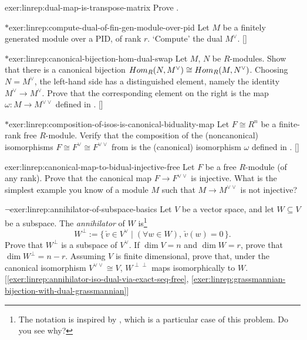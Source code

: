 \begin{exer}{}{exer:linrep:dual-map-is-transpose-matrix}
  Prove .
\end{exer}

\begin{exer}{$*$}{exer:linrep:compute-dual-of-fin-gen-module-over-pid}
  Let $M$ be a finitely generated module over a PID, of rank $r$.
  `Compute' the dual
  $M^\vee$. []
\end{exer}

\begin{exer}{$*$}{exer:linrep:canonical-bijection-hom-dual-swap}
  Let $M$, $N$ be $R$-modules. Show that there is a canonical
  bijection $Hom_R(N, M^\vee) \cong Hom_R(M, N^\vee)$. Choosing
  $N = M^\vee$, the left-hand side has a distinguished element, namely
  the identity $M^\vee \to M^\vee$.  Prove that the corresponding
  element on the right is the map $\omega : M \to M^{\vee\vee}$
  defined in
  . []
\end{exer}

\begin{exer}{$*$}{exer:linrep:composition-of-isos-is-canonical-biduality-map}
  Let $F \cong R^n$ be a finite-rank free $R$-module. Verify that the
  composition of the (noncanonical) isomorphisms
  $F \cong F^\vee \cong F^{\vee\vee}$ from 
  is the (canonical) isomorphism $\omega$ defined in
  . []
\end{exer}

\begin{exer}{}{exer:linrep:canonical-map-to-bidual-injective-free}
  Let $F$ be a free $R$-module (of any rank). Prove that the canonical
  map $F \to F^{\vee\vee}$ is injective. What is the simplest example
  you know of a module $M$ such that $M \to M^{\vee\vee}$ is not
  injective?
\end{exer}

\begin{exer}{$\lnot$}{exer:linrep:annihilator-of-subspace-basics}
  Let $V$ be a vector space, and let $W \subseteq V$ be a subspace.
  The \emph{annihilator} of $W$ is\footnote{The notation is inspired
    by
    ,
    which is a particular case of this problem. Do you see why?}
  \[
    W^\perp := \{\,\check{v} \in V^\vee \mid (\forall w \in W),\,
    \check{v}(w) = 0\,\}.
  \]
  Prove that $W^\perp$ is a subspace of $V^\vee$. If $\dim V = n$ and
  $\dim W = r$, prove that $\dim W^\perp = n - r$. Assuming $V$ is
  finite dimensional, prove that, under the canonical isomorphism
  $V^{\vee\vee} \cong V$, $W^{\perp\perp}$ maps isomorphically to
  $W$. [\ref{exer:linrep:annihilator-iso-dual-via-exact-seq-free},
  \ref{exer:linrep:grassmannian-bijection-with-dual-grassmannian}]
\end{exer}

